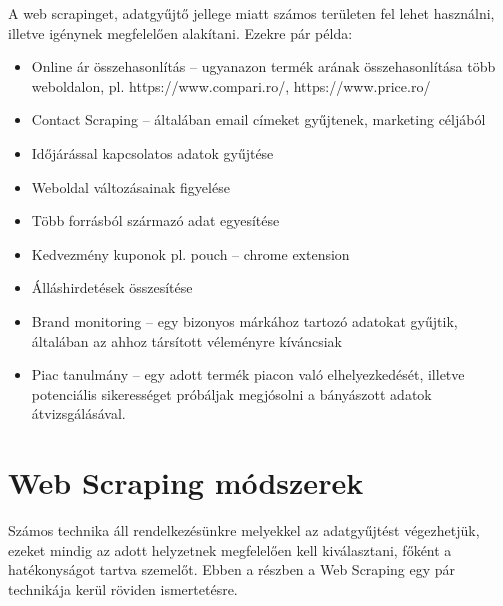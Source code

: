 A web scrapinget, adatgyűjtő jellege miatt számos területen fel lehet használni, illetve igénynek megfelelően alakítani. Ezekre pár példa:

\begin{itemize}
    \item Online ár összehasonlítás – ugyanazon termék arának összehasonlítása több weboldalon, pl. https://www.compari.ro/, https://www.price.ro/ 
	\item Contact Scraping – általában email címeket gyűjtenek, marketing céljából
    \item Időjárással kapcsolatos adatok gyűjtése
    \item Weboldal változásainak figyelése
	\item Több forrásból származó adat egyesítése
	\item Kedvezmény kuponok pl. pouch – chrome extension
	\item Álláshirdetések összesítése
	\item Brand monitoring – egy bizonyos márkához tartozó adatokat gyűjtik, általában az ahhoz társított véleményre kíváncsiak
    \item Piac tanulmány – egy adott termék piacon való elhelyezkedését, illetve potenciális sikerességet próbáljak megjósolni a bányászott adatok átvizsgálásával.
\end{itemize}

\section{Web Scraping módszerek}
Számos technika áll rendelkezésünkre melyekkel az adatgyűjtést végezhetjük, ezeket mindig az adott helyzetnek megfelelően kell kiválasztani, főként a hatékonyságot tartva szemelőt. Ebben a részben a Web Scraping egy pár technikája kerül röviden ismertetésre.


